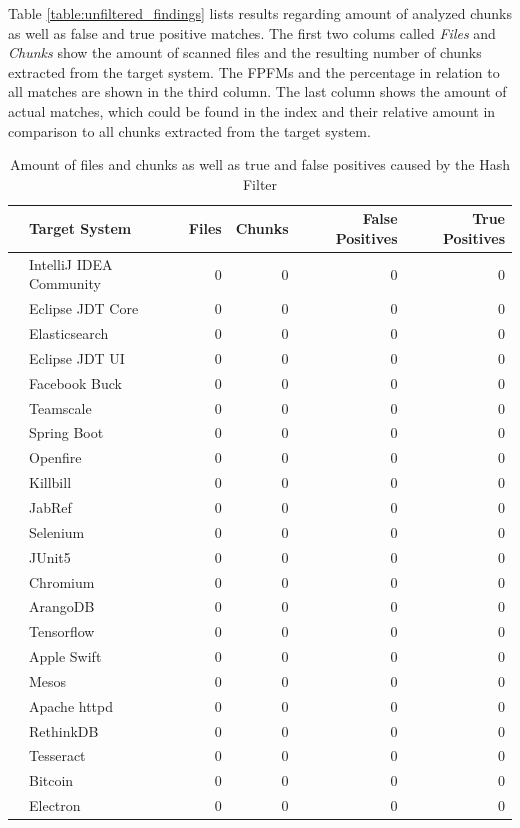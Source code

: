 Table \autoref{table:unfiltered_findings} lists results regarding amount of analyzed chunks as well as false and true positive matches.
The first two colums called \textit{Files} and \textit{Chunks} show the amount of scanned files and the resulting number of chunks extracted from the target system.
The FPFMs and the percentage in relation to all matches are shown in the third column.
The last column shows the amount of actual matches, which could be found in the index and their relative amount in comparison to all chunks extracted from the target system.

\begin{table}[ht]
	\centering
	\begin{tabular}{l|lrrrr}
		 & \textbf{Target System} & \textbf{Files} & \textbf{Chunks} & \textbf{False Positives} & \textbf{True Positives} \\ 
		\hline 
		\parbox[t]{2mm}{} 
		& IntelliJ IDEA Community & 0 & 0 & 0 & 0 \\
		& Eclipse JDT Core & 0 & 0 & 0 & 0  \\
		& Elasticsearch & 0 & 0 & 0 & 0  \\
		& Eclipse JDT UI & 0 & 0 & 0 & 0  \\
		& Facebook Buck & 0 & 0 & 0 & 0  \\
		& Teamscale & 0 & 0 & 0 & 0  \\
		& Spring Boot & 0 & 0 & 0 & 0 \\
		& Openfire & 0 & 0 & 0 & 0  \\
		& Killbill & 0 & 0 & 0 & 0  \\
		& JabRef & 0 & 0 & 0 & 0 \\
		& Selenium & 0 & 0 & 0 & 0 \\
		& JUnit5 & 0 & 0 & 0 & 0 \\
		\hline 
		\parbox[t]{2mm}{} 
		& Chromium & 0 & 0 & 0 & 0 \\
		& ArangoDB & 0 & 0 & 0 & 0 \\
		& Tensorflow & 0 & 0 & 0 & 0 \\
		& Apple Swift & 0 & 0 & 0 & 0 \\
		& Mesos & 0 & 0 & 0 & 0 \\
		& Apache httpd & 0 & 0 & 0 & 0 \\
		& RethinkDB & 0 & 0 & 0 & 0 \\
		& Tesseract & 0 & 0 & 0 & 0 \\
		& Bitcoin & 0 & 0 & 0 & 0 \\
		& Electron & 0 & 0 & 0 & 0 \\
	\end{tabular}
	\caption{Amount of files and chunks as well as true and false positives caused by the Hash Filter}\label{table:unfiltered_findings}
\end{table}

